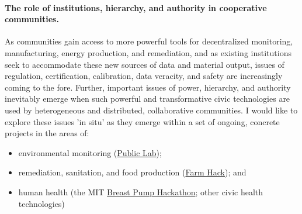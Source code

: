 \documentclass[10pt]{article}
\begin{document}

\paragraph{The role of institutions, hierarchy, and authority in cooperative communities.} As communities gain access to more powerful tools for decentralized monitoring, manufacturing, energy production, and remediation, and as existing institutions seek to accommodate these new sources of data and material output, issues of regulation, certification, calibration, data veracity, and safety are increasingly coming to the fore.  Further, important issues of power, hierarchy, and authority inevitably emerge when such powerful and transformative civic technologies are used by heterogeneous and distributed, collaborative communities.  I would like to explore these issues 'in situ' as they emerge within a set of ongoing, concrete projects in the areas of: 

\begin{itemize}
\item environmental monitoring (\href{http://publiclab.org}{Public Lab});
\item remediation, sanitation, and food production (\href{http://farmhack.net}{Farm Hack}); and 
\item human health (the MIT \href{http://breastpump.media.mit.edu/}{Breast Pump Hackathon}; other civic health technologies)
\end{itemize}
\end{document}
